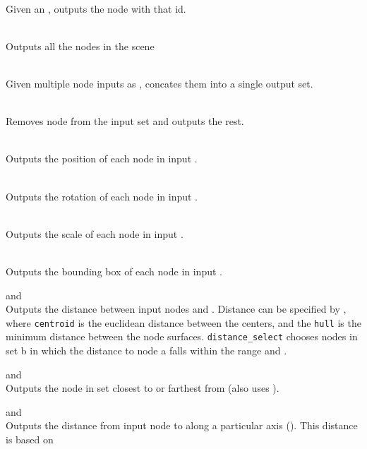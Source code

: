 \begin{description}
  \item{} \\
    Given an , outputs the node with that id.
  \item{} \\
    Outputs all the nodes in the scene
  \item{} \\
    Given multiple node inputs as , concates them into a single output set.
  \item{} \\
    Removes node  from the input set  and outputs the rest. 
  \item{} \\
    Outputs the position of each node in input .
  \item{} \\
    Outputs the rotation of each node in input .
  \item{} \\
    Outputs the scale of each node in input .
  \item{} \\
    Outputs the bounding box of each node in input .
\item{ and } \\
  Outputs the distance between input nodes  and . 
  Distance can be specified by , where
  \texttt{centroid} is the euclidean distance between the centers, and the \texttt{hull}
  is the minimum distance between the node surfaces. \texttt{distance\_select} chooses
  nodes in set b in which the distance to node a falls within the range  and .
\item{ and } \\
  Outputs the node in set  closest to or farthest from 
  (also uses ).
\item{ and } \\
  Outputs the distance from input node  to  along
  a particular axis (). This distance is based on 

\end{description}
